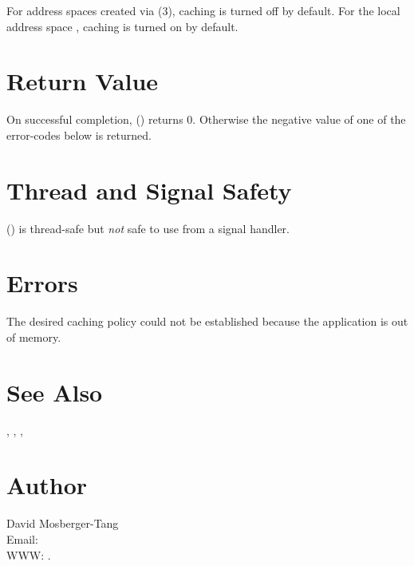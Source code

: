 \documentclass{article}
\begin{document}
For address spaces created via (3),
caching is turned off by default.  For the local address space
, caching is turned on by default.

\section{Return Value}

On successful completion, () returns 0.
Otherwise the negative value of one of the error-codes below is
returned.

\section{Thread and Signal Safety}

() is thread-safe but \emph{not} safe
to use from a signal handler.

\section{Errors}

\begin{Description}
\item[\Const{UNW\_ENOMEM}] The desired caching policy could not be
  established because the application is out of memory.
\end{Description}

\section{See Also}

,
,
,

\section{Author}

\noindent
David Mosberger-Tang\\
Email: \\
WWW: .
\LatexManEnd
\end{document}
